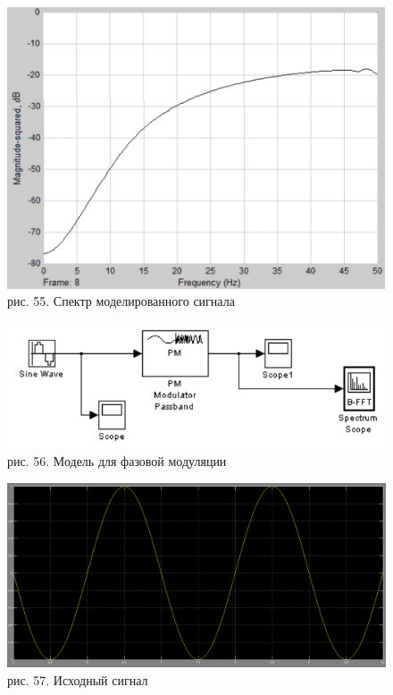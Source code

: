 \documentclass[10pt,a4paper]{report}
\begin{document}
\begin{figure}
\begin{center}
\includegraphics[width=150mm, scale = 0.9]{8_6}\newline
рис. 55. Спектр моделированного сигнала\newline
\end{center}
\end{figure}
\begin{figure}
\begin{center}
\includegraphics[width=150mm, scale = 0.9]{8_7}\newline
рис. 56. Модель для фазовой модуляции\newline
\end{center}
\end{figure}
\begin{figure}
\begin{center}
\includegraphics[width=150mm, scale = 0.9]{8_8}\newline
рис. 57. Исходный сигнал\newline
\end{center}
\end{figure}
\end{document}
